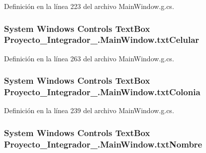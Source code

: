 Definición en la línea 223 del archivo Main\-Window.\-g.\-cs.

\hypertarget{class_proyecto___integrador__3_1_1_main_window_ac9cc63316a297453b50f4b8704503109}{
\subsubsection[{txt\-Celular}]{\setlength{\rightskip}{0pt plus 5cm}System Windows Controls Text\-Box Proyecto\-\_\-\-Integrador\-\_.\-Main\-Window.\-txt\-Celular\hspace{0.3cm}{\ttfamily [package]}}}\label{class_proyecto___integrador__3_1_1_main_window_ac9cc63316a297453b50f4b8704503109}


Definición en la línea 263 del archivo Main\-Window.\-g.\-cs.

\hypertarget{class_proyecto___integrador__3_1_1_main_window_a3c03dcfb84d69ba923dcc7d54d98c569}{
\subsubsection[{txt\-Colonia}]{\setlength{\rightskip}{0pt plus 5cm}System Windows Controls Text\-Box Proyecto\-\_\-\-Integrador\-\_.\-Main\-Window.\-txt\-Colonia\hspace{0.3cm}{\ttfamily [package]}}}\label{class_proyecto___integrador__3_1_1_main_window_a3c03dcfb84d69ba923dcc7d54d98c569}


Definición en la línea 239 del archivo Main\-Window.\-g.\-cs.

\hypertarget{class_proyecto___integrador__3_1_1_main_window_a66650387b40eb348806d9692d163e03a}{
\subsubsection[{txt\-Nombre}]{\setlength{\rightskip}{0pt plus 5cm}System Windows Controls Text\-Box Proyecto\-\_\-\-Integrador\-\_.\-Main\-Window.\-txt\-Nombre\hspace{0.3cm}{\ttfamily [package]}}}\label{class_proyecto___integrador__3_1_1_main_window_a66650387b40eb348806d9692d163e03a}


